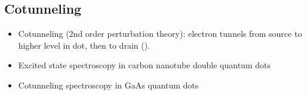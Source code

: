 \subsection{Cotunneling}

\begin{itemize}
    \item Cotunneling (2nd order perturbation theory): electron tunnels from source to higher level in dot, then to drain ().
    \item Excited state spectroscopy in carbon nanotube double quantum dots \parencite{Sapmaz2005}
    \item Cotunneling spectroscopy in GaAs quantum dots \parencite{Zumbuhl2004}
\end{itemize}